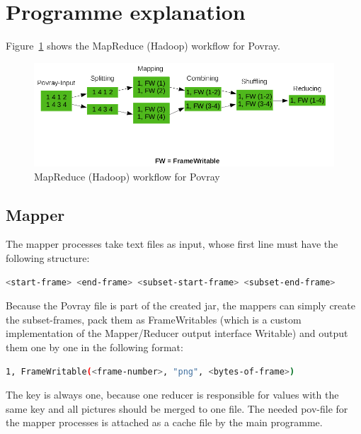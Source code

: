 \documentclass{article}
\begin{document}
\section{Programme explanation}

Figure~\ref{fig:map-reduce-povray-workflow} shows the MapReduce (Hadoop) workflow for Povray.

\begin{figure}[htbp]
\begin{center}
\includegraphics[width=\textwidth]{map-reduce-povray-workflow.png}
\caption{MapReduce (Hadoop) workflow for Povray}
\label{fig:map-reduce-povray-workflow}
\end{center}
\end{figure}

\subsection{Mapper}

The mapper processes take text files as input, whose first line must have the following structure:

\begin{lstlisting}[language=bash, deletekeywords={cd}]
  <start-frame> <end-frame> <subset-start-frame> <subset-end-frame>
\end{lstlisting}

Because the Povray file is part of the created jar, the mappers can simply create the subset-frames, pack them as FrameWritables (which is a custom implementation of the Mapper/Reducer output interface Writable) and output them one by one in the following format:

\begin{lstlisting}[language=bash, deletekeywords={cd}]
  1, FrameWritable(<frame-number>, "png", <bytes-of-frame>)
\end{lstlisting}

The key is always one, because one reducer is responsible for values with the same key and all pictures should be merged to one file.
The needed pov-file for the mapper processes is attached as a cache file by the main programme.
\end{document}
